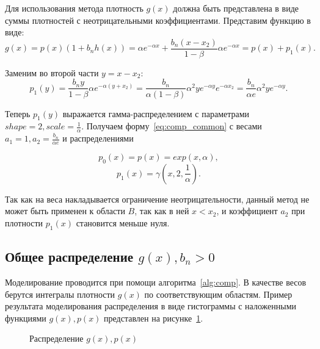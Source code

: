 \documentclass[12pt, specialist, subf, substylefile = spbu.rtx]{disser}
\begin{document}
Для использования метода плотность $g(x)$ должна быть представлена в виде суммы плотностей с неотрицательными коэффициентами. Представим функцию в виде:
$$
g(x)=p(x)(1+b_nh(x))=\alpha e^{-\alpha x} + \frac{b_n(x-x_2)}{1-\beta}\alpha e^{-\alpha x}=p(x)+p_1(x).
$$

Заменим во второй части $y=x-x_2$:
$$
p_1(y)=\frac{b_ny}{1-\beta} \alpha e^{-\alpha (y+x_2)}=
\frac{b_n}{\alpha(1-\beta)} \alpha^2 ye^{-\alpha y}e^{-\alpha x_2}=
\frac{b_n}{\alpha e} \alpha^2 ye^{-\alpha y}.
$$

Теперь $p_1(y)$ выражается гамма-распределением с параметрами $shape=2, scale=\frac{1}{\alpha}$. Получаем форму~\eqref{eq:comp_common} с весами $a_1=1, a_2=\frac{b_n}{\alpha e}$ и распределениями 

$$
p_0(x)=p(x)=exp(x, \alpha),
$$ 
$$
p_1(x)=\gamma(x, 2, \frac{1}{\alpha}).
$$

Так как на веса накладывается ограничение неотрицательности, данный метод не может быть применен к области $B$, так как в ней $x < x_2$, и коэффициент $a_2$ при плотности $p_1(x)$ становится меньше нуля.


\subsection{Общее распределение $g(x), b_n > 0$}

Моделирование проводится при помощи алгоритма~\ref{alg:comp}. В качестве весов берутся интегралы плотности $g(x)$ по соответствующим областям. Пример результата моделирования распределения в виде гистограммы с наложенными функциями $g(x), p(x)$ представлен на рисунке~\ref{ris:hist1}. 

\begin{figure}[h]
\caption{Распределение $g(x), p(x)$}
\label{ris:hist1}
\end{figure}
\end{document}
